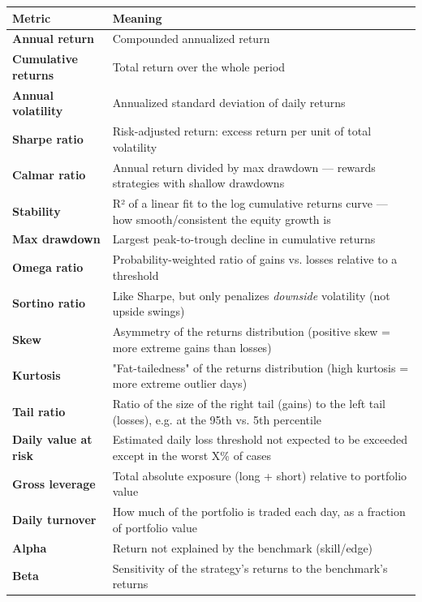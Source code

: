 \documentclass[12pt,openany]{book}
\theoremstyle{definition}
\theoremstyle{remark}
\begin{document}
\begin{longtable}{@{}L{0.46\textwidth}L{0.46\textwidth}@{}}
\toprule
\textbf{Metric} & \textbf{Meaning} \\
\midrule
\textbf{Annual return} & Compounded annualized return \\
\textbf{Cumulative returns} & Total return over the whole period \\
\textbf{Annual volatility} & Annualized standard deviation of daily returns \\
\textbf{Sharpe ratio} & Risk-adjusted return: excess return per unit of total volatility \\
\textbf{Calmar ratio} & Annual return divided by max drawdown — rewards strategies with shallow drawdowns \\
\textbf{Stability} & R² of a linear fit to the log cumulative returns curve — how smooth/consistent the equity growth is \\
\textbf{Max drawdown} & Largest peak-to-trough decline in cumulative returns \\
\textbf{Omega ratio} & Probability-weighted ratio of gains vs. losses relative to a threshold \\
\textbf{Sortino ratio} & Like Sharpe, but only penalizes \emph{downside} volatility (not upside swings) \\
\textbf{Skew} & Asymmetry of the returns distribution (positive skew = more extreme gains than losses) \\
\textbf{Kurtosis} & "Fat-tailedness" of the returns distribution (high kurtosis = more extreme outlier days) \\
\textbf{Tail ratio} & Ratio of the size of the right tail (gains) to the left tail (losses), e.g. at the 95th vs. 5th percentile \\
\textbf{Daily value at risk} & Estimated daily loss threshold not expected to be exceeded except in the worst X\% of cases \\
\textbf{Gross leverage} & Total absolute exposure (long + short) relative to portfolio value \\
\textbf{Daily turnover} & How much of the portfolio is traded each day, as a fraction of portfolio value \\
\textbf{Alpha} & Return not explained by the benchmark (skill/edge) \\
\textbf{Beta} & Sensitivity of the strategy's returns to the benchmark's returns \\
\bottomrule
\end{longtable}
\end{document}
